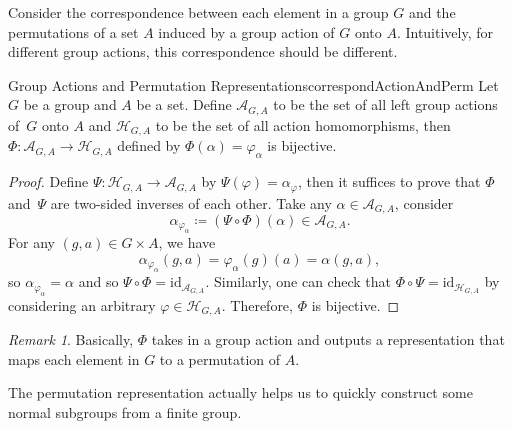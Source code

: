 \documentclass[math]{amznotes}
\theoremstyle{remark}
\newtheorem*{remark}{Remark}
\newcommand{\0}{\mathbf{0}}
\newcommand{\1}{\mathbf{1}}
\begin{document}
Consider the correspondence between each element in a group $G$ and the permutations of a set $A$ induced by a group action of $G$ onto $A$. Intuitively, for different group actions, this correspondence should be different. 
\begin{probox}{Group Actions and Permutation Representations}{correspondActionAndPerm}
    Let $G$ be a group and $A$ be a set. Define $\mathcal{A}_{G, A}$ to be the set of all left group actions of~$G$ onto $A$ and $\mathcal{H}_{G, A}$ to be the set of all action homomorphisms, then $\Phi \colon \mathcal{A}_{G, A} \to \mathcal{H}_{G, A}$ defined by $\Phi\left(\alpha\right) = \varphi_{\alpha}$ is bijective.
    \tcblower
    \begin{proof}
        Define $\Psi \colon \mathcal{H}_{G, A} \to \mathcal{A}_{G, A}$ by $\Psi\left(\varphi\right) = \alpha_{\varphi}$, then it suffices to prove that $\Phi$ and~$\Psi$ are two-sided inverses of each other. Take any $\alpha \in \mathcal{A}_{G, A}$, consider 
        \begin{equation*}
            \alpha_{\varphi_{\alpha}} \coloneqq \left(\Psi \circ \Phi\right)\left(\alpha\right) \in \mathcal{A}_{G, A}.
        \end{equation*}
        For any $\left(g, a\right) \in G \times A$, we have 
        \begin{equation*}
            \alpha_{\varphi_{\alpha}}\left(g, a\right) = \varphi_{\alpha}\left(g\right)\left(a\right) = \alpha\left(g, a\right),
        \end{equation*}
        so $\alpha_{\varphi_{\alpha}} = \alpha$ and so $\Psi \circ \Phi = \mathrm{id}_{\mathcal{A}_{G, A}}$. Similarly, one can check that $\Phi \circ \Psi = \mathrm{id}_{\mathcal{H}_{G, A}}$ by considering an arbitrary $\varphi \in \mathcal{H}_{G, A}$. Therefore, $\Phi$ is bijective.
    \end{proof}
\end{probox}
\begin{notebox}
    \begin{remark}
        Basically, $\Phi$ takes in a group action and outputs a representation that maps each element in $G$ to a permutation of $A$.
    \end{remark}
\end{notebox}
The permutation representation actually helps us to quickly construct some normal subgroups from a finite group.
\end{document}
